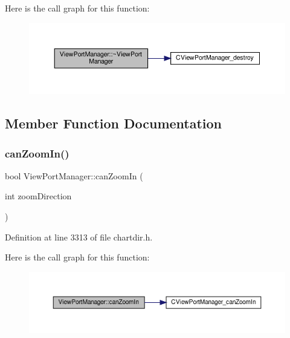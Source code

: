 Here is the call graph for this function\+:
\nopagebreak
\begin{figure}[H]
\begin{center}
\leavevmode
\includegraphics[width=350pt]{class_view_port_manager_a246382d798570dd477efd4da1946778d_cgraph}
\end{center}
\end{figure}


\subsection{Member Function Documentation}
\mbox{\label{class_view_port_manager_a93ca31738c1840842ef7b66cd4037b8e}} 
\subsubsection{\texorpdfstring{can\+Zoom\+In()}{canZoomIn()}}
{\footnotesize\ttfamily bool View\+Port\+Manager\+::can\+Zoom\+In (\begin{DoxyParamCaption}\item[{int}]{zoom\+Direction }\end{DoxyParamCaption})\hspace{0.3cm}{\ttfamily [inline]}}



Definition at line 3313 of file chartdir.\+h.

Here is the call graph for this function\+:
\nopagebreak
\begin{figure}[H]
\begin{center}
\leavevmode
\includegraphics[width=350pt]{class_view_port_manager_a93ca31738c1840842ef7b66cd4037b8e_cgraph}
\end{center}
\end{figure}
\mbox{\label{class_view_port_manager_a34b7404aa68b4a172c9db29f09898637}} 
